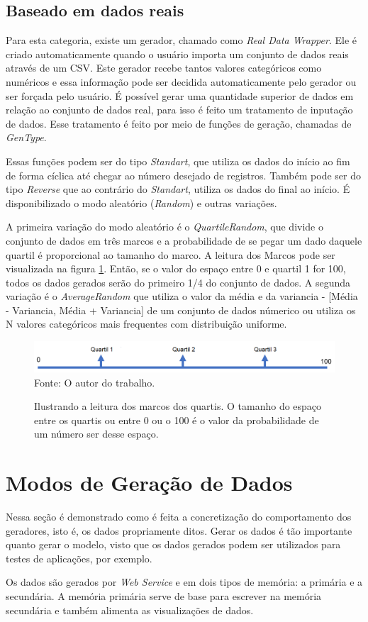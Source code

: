 \documentclass[
	12pt,				%
	openright,			%
	oneside,			%
	a4paper,			%
	english,			%
	brazil				%
	]{abntex2}
\begin{document}
		\subsection{Baseado em dados reais}
			Para esta categoria, existe um gerador, chamado como \emph{Real Data Wrapper}.
			Ele é criado automaticamente quando o usuário importa um conjunto de dados reais através de um CSV.
			Este gerador recebe tantos valores categóricos como numéricos e essa informação pode ser decidida automaticamente pelo gerador ou ser forçada pelo usuário.
			É possível gerar uma quantidade superior de dados em relação ao conjunto de dados real, para isso é feito um tratamento de inputação de dados.
			Esse tratamento é feito por meio de funções de geração, chamadas de \emph{GenType}.
			\par
			Essas funções podem ser do tipo \emph{Standart}, que utiliza os dados do início ao fim de forma cíclica até chegar ao número desejado de registros.
			Também pode ser do tipo \emph{Reverse} que ao contrário do \emph{Standart}, utiliza os dados do final ao início.
			É disponibilizado o modo aleatório (\emph{Random}) e outras variações.
			\par
			A primeira variação do modo aleatório é o \emph{QuartileRandom}, que divide o conjunto de dados em três marcos e a probabilidade de se pegar um dado daquele quartil é proporcional ao tamanho do marco.
			A leitura dos Marcos pode ser visualizada na figura \ref{fig:leituraMarco}. Então, se o valor do espaço entre 0 e quartil 1 for 100, todos os dados gerados serão do primeiro 1/4 do conjunto de dados.
			A segunda variação é o \emph{AverageRandom} que utiliza o valor da média e da variancia - [Média - Variancia, Média + Variancia] de um conjunto de dados númerico ou utiliza os N valores categóricos mais frequentes com distribuição uniforme.
			\begin{figure}[h]
				\centering
				\caption{Ilustrando a leitura dos marcos dos quartis. O tamanho do espaço entre os quartis ou entre 0 ou o 100 é o valor da probabilidade de um número ser desse espaço.}
				\includegraphics[width=\linewidth]{./figures/prototipo/quartil.png}
				\label{fig:leituraMarco}
				\footnotesize Fonte: O autor do trabalho.
			\end{figure}
	\section{Modos de Geração de Dados}
		Nessa seção é demonstrado como é feita a concretização do comportamento dos geradores, isto é, os dados propriamente ditos.
		Gerar os dados é tão importante quanto gerar o modelo, visto que os dados gerados podem ser utilizados para testes de aplicações, por exemplo.
		\par
		Os dados são gerados por \emph{Web Service} e em dois tipos de memória: a primária e a secundária.
		A memória primária serve de base para escrever na memória secundária e também alimenta as visualizações de dados.
\end{document}
